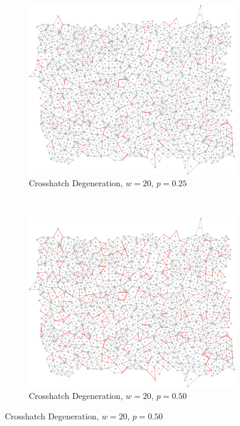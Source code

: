 \documentclass[a4paper,11pt]{article}
\begin{document}
\begin{figure}[htp]
\centering
\begin{subfigure}[t]{0.45\textwidth}
  \includegraphics[width=\textwidth]{ch6_figs/cross_hatch_p25_w20}
  \caption{Crosshatch Degeneration, $w=20$, $p=0.25$}

\end{subfigure}
~
\begin{subfigure}[t]{0.45\textwidth}
  \centering
  \includegraphics[width=\textwidth]{ch6_figs/cross_hatch_p50_w20}
  \caption{Crosshatch Degeneration, $w=20$, $p=0.50$}


\end{subfigure}
\end{figure}
\end{document}
